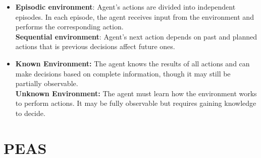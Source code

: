\begin{itemize}
   
   \item
   \textbf{Episodic environment}: Agent's actions are divided into independent episodes. In each episode, the agent receives input from the environment and performs the corresponding action.\\
   \textbf{Sequential environment}: Agent's next action depends on past and planned actions that is previous decisions affect future ones.
   
   
   \item
   \textbf{Known Environment:} The agent knows the results of all actions and can make decisions based on complete information, though it may still be partially observable.\\
   \textbf{Unknown Environment:} The agent must learn how the environment works to perform actions. It may be fully observable but requires gaining knowledge to decide.
\end{itemize}


\section{PEAS}

